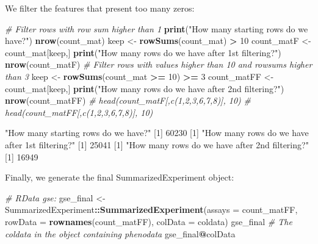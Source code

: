 \documentclass[
]{article}
\newenvironment{Shaded}{\begin{snugshade}}{\end{snugshade}}
\newcommand{\AttributeTok}[1]{\textcolor[rgb]{0.13,0.29,0.53}{#1}}
\newcommand{\CommentTok}[1]{\textcolor[rgb]{0.56,0.35,0.01}{\textit{#1}}}
\newcommand{\DecValTok}[1]{\textcolor[rgb]{0.00,0.00,0.81}{#1}}
\newcommand{\FunctionTok}[1]{\textcolor[rgb]{0.13,0.29,0.53}{\textbf{#1}}}
\newcommand{\NormalTok}[1]{#1}
\newcommand{\OtherTok}[1]{\textcolor[rgb]{0.56,0.35,0.01}{#1}}
\newcommand{\SpecialCharTok}[1]{\textcolor[rgb]{0.81,0.36,0.00}{\textbf{#1}}}
\newcommand{\StringTok}[1]{\textcolor[rgb]{0.31,0.60,0.02}{#1}}
\begin{document}
We filter the features that present too many zeros:

\begin{Shaded}
\begin{Highlighting}[]
\CommentTok{\# Filter rows with row sum higher than 1}
\FunctionTok{print}\NormalTok{(}\StringTok{"How many starting rows do we have?"}\NormalTok{)}
\FunctionTok{nrow}\NormalTok{(count\_mat)}
\NormalTok{keep }\OtherTok{\textless{}{-}} \FunctionTok{rowSums}\NormalTok{(count\_mat) }\SpecialCharTok{\textgreater{}} \DecValTok{10}
\NormalTok{count\_matF }\OtherTok{\textless{}{-}}\NormalTok{ count\_mat[keep,]}
\FunctionTok{print}\NormalTok{(}\StringTok{"How many rows do we have after 1st filtering?"}\NormalTok{)}
\FunctionTok{nrow}\NormalTok{(count\_matF)}
\CommentTok{\# Filter rows with values higher than 10 and rowsums higher than 3}
\NormalTok{keep }\OtherTok{\textless{}{-}} \FunctionTok{rowSums}\NormalTok{(count\_mat }\SpecialCharTok{\textgreater{}=} \DecValTok{10}\NormalTok{) }\SpecialCharTok{\textgreater{}=} \DecValTok{3}
\NormalTok{count\_matFF }\OtherTok{\textless{}{-}}\NormalTok{ count\_mat[keep,]}
\FunctionTok{print}\NormalTok{(}\StringTok{"How many rows do we have after 2nd filtering?"}\NormalTok{)}
\FunctionTok{nrow}\NormalTok{(count\_matFF)}
\CommentTok{\# head(count\_matF[,c(1,2,3,6,7,8)], 10)}
\CommentTok{\# head(count\_matFF[,c(1,2,3,6,7,8)], 10)}
\end{Highlighting}
\end{Shaded}

\begin{Shaded}
\begin{Highlighting}[]
\NormalTok{[1] "How many starting rows do we have?"}
\NormalTok{[1] 60230}
\NormalTok{[1] "How many rows do we have after 1st filtering?"}
\NormalTok{[1] 25041}
\NormalTok{[1] "How many rows do we have after 2nd filtering?"}
\NormalTok{[1] 16949}
\end{Highlighting}
\end{Shaded}

Finally, we generate the final SummarizedExperiment object:

\begin{Shaded}
\begin{Highlighting}[]
\CommentTok{\# RData gse:}
\NormalTok{gse\_final }\OtherTok{\textless{}{-}}\NormalTok{ SummarizedExperiment}\SpecialCharTok{::}\FunctionTok{SummarizedExperiment}\NormalTok{(}\AttributeTok{assays =}\NormalTok{ count\_matFF,}
                          \AttributeTok{rowData =} \FunctionTok{rownames}\NormalTok{(count\_matFF), }\AttributeTok{colData =}\NormalTok{ coldata)}
\NormalTok{gse\_final}
\CommentTok{\# The coldata in the object containing phenodata }
\NormalTok{gse\_final}\SpecialCharTok{@}\NormalTok{colData}
\end{Highlighting}
\end{Shaded}
\end{document}
